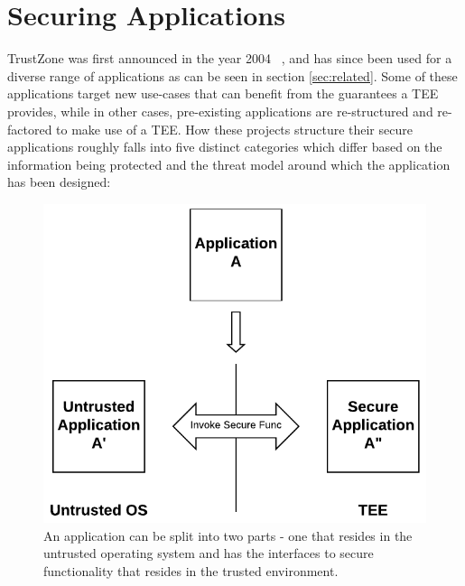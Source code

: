 \chapter{Securing Applications}
\label{ch:unmodified_app}
TrustZone was first announced in the year 2004 ~\cite{trustzone}, and has since been used for a diverse
range of applications as can be seen in section \ref{sec:related}. Some of these applications target new use-cases that can benefit from the guarantees a TEE provides, while in other cases, pre-existing applications are re-structured and re-factored to make use of a TEE. How these projects structure their secure applications roughly falls into five distinct categories which differ based on the information being protected and the threat model around which the application has been designed: 

\begin{figure}[t]
    \centering
    \includegraphics{fig/split_app.pdf}
    \caption{An application can be split into two parts - one that resides in the untrusted operating system and has the interfaces to secure functionality that resides in the trusted environment.}
    \label{fig:split_app}
\end{figure}



